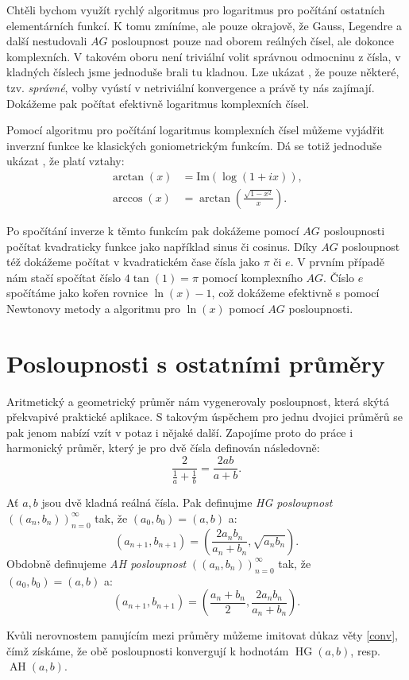 \documentclass[12pt]{report}
\DeclareMathOperator{\HG}{HG}
\DeclareMathOperator{\AH}{AH}
\begin{document}
Chtěli bychom využít rychlý algoritmus pro logaritmus pro počítání ostatních elementárních funkcí. K tomu zmíníme, ale pouze okrajově, že Gauss, Legendre a další nestudovali $AG$ posloupnost pouze nad oborem reálných čísel, ale dokonce komplexních. V takovém oboru není triviální volit správnou odmocninu z čísla, v kladných číslech jsme jednoduše brali tu kladnou. Lze ukázat \cite{Cox}, že pouze některé, tzv. \textit{správné}, volby vyústí v netriviální konvergence a právě ty nás zajímají. Dokážeme pak počítat efektivně logaritmus komplexních čísel.  

Pomocí algoritmu pro počítání logaritmus komplexních čísel můžeme vyjádřit inverzní funkce ke klasických goniometrickým funkcím. Dá se totiž jednoduše ukázat \cite[Ch. 7]{Pi}, že platí vztahy:
\begin{align*}
\arctan (x) &= \textrm{Im}(\log(1+ix)),\\
\arccos (x) &= \arctan\left(\frac{\sqrt{1-x^2}}{x} \right).
\end{align*}

Po spočítání inverze k těmto funkcím pak dokážeme pomocí $AG$ posloupnosti počítat kvadraticky funkce jako například sinus či cosinus. Díky $AG$ posloupnost též dokážeme počítat v kvadratickém čase čísla jako $\pi$ či $e$. V prvním případě nám stačí spočítat číslo $4\tan(1) = \pi$ pomocí komplexního $AG$. Číslo $e$ spočítáme jako kořen rovnice $\ln(x) - 1$, což dokážeme efektivně s pomocí Newtonovy metody a algoritmu pro $\ln(x)$ pomocí $AG$ posloupnosti.

\section{Posloupnosti s ostatními průměry}

Aritmetický a geometrický průměr nám vygenerovaly posloupnost, která skýtá překvapivé praktické aplikace. S takovým úspěchem pro jednu dvojici průměrů se pak jenom nabízí vzít v potaz i nějaké další. Zapojíme proto do práce i harmonický průměr, který je pro dvě čísla definován následovně:
$$\frac{2}{\frac{1}{a}+\frac{1}{b}} = \frac{2ab}{a+b}.$$

\begin{definice}
Ať $a,b$ jsou dvě kladná reálná čísla. Pak definujme \textit{HG posloupnost} $((a_n,b_n))_{n=0}^{\infty}$ tak, že $(a_0,b_0) = (a,b)$ a:
$$\left(a_{n+1},b_{n+1} \right) = \left( \frac{2 a_n b_n}{a_n+b_n} , \sqrt{a_n b_n} \right).$$
Obdobně definujeme \textit{AH posloupnost} $((a_n,b_n))_{n=0}^{\infty}$ tak, že $(a_0,b_0) = (a,b)$ a:
$$\left(a_{n+1},b_{n+1} \right) = \left( \frac{a_n+b_n}{2}, \frac{2 a_n b_n}{a_n+b_n} \right).$$
\end{definice}
Kvůli nerovnostem panujícím mezi průměry můžeme imitovat důkaz věty \ref{conv}, čímž získáme, že obě posloupnosti konvergují k hodnotám $\HG(a,b)$, resp. $\AH(a,b)$.
\end{document}
